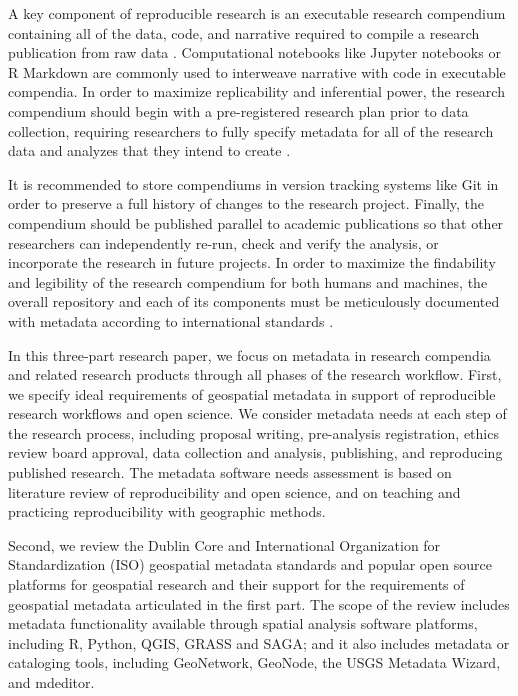 \documentclass{isprs} %
\begin{document}
A key component of reproducible research is an executable research compendium containing all of the data, code, and narrative required to compile a research publication from raw data \citep{Nust2021}.
Computational notebooks like Jupyter notebooks or R Markdown are commonly used to interweave narrative with code in executable compendia.
In order to maximize replicability and inferential power, the research compendium should begin with a pre-registered research plan prior to data collection, requiring researchers to fully specify metadata for all of the research data and analyzes that they intend to create \citep{Nosek2018}.

It is recommended to store compendiums in version tracking systems like Git in order to preserve a full history of changes to the research project.
Finally, the compendium should be published parallel to academic publications so that other researchers can independently re-run, check and verify the analysis, or incorporate the research in future projects.
In order to maximize the findability and legibility of the research compendium for both humans and machines, the overall repository and each of its components must be meticulously documented with metadata according to international standards \citep{Wilkinson2016,Wilson2021}.

In this three-part research paper, we focus on metadata in research compendia and related research products through all phases of the research workflow.
First, we specify ideal requirements of geospatial metadata in support of reproducible research workflows and open science.
We consider metadata needs at each step of the research process, including proposal writing, pre-analysis registration, ethics review board approval, data collection and analysis, publishing, and reproducing published research.
The metadata software needs assessment is based on literature review of reproducibility and open science, and on teaching and practicing reproducibility with geographic methods.

Second, we review the Dublin Core and International Organization for Standardization (ISO) geospatial metadata standards and popular open source platforms for geospatial research and their support for the requirements of geospatial metadata articulated in the first part.
The scope of the review includes metadata functionality available through spatial analysis software platforms, including R, Python, QGIS, GRASS and SAGA; and it also includes metadata or cataloging tools, including GeoNetwork, GeoNode, the USGS Metadata Wizard, and mdeditor.
\end{document}
